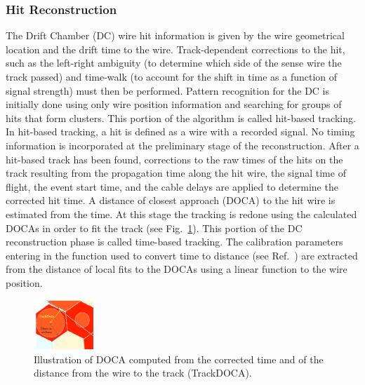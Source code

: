 \subsubsection{Hit Reconstruction}
\label{sec:hitrecon}

The Drift Chamber (DC) wire hit information is given by the wire geometrical location and the drift time to the
wire. Track-dependent corrections to the hit, such as the left-right ambiguity (to determine which side of the
sense wire the track passed) and time-walk (to account for the shift in time as a function of signal strength)
must then be performed. Pattern recognition for the DC is initially done using only wire position information and
searching for groups of hits that form clusters. This portion of the algorithm is called hit-based tracking.  In
hit-based tracking, a hit is defined as a wire with a recorded signal. No timing information is incorporated at the
preliminary stage of the reconstruction. After a hit-based track has been found, corrections to the raw times of
the hits on the track resulting from the propagation time along the hit wire, the signal time of flight, the event start
time, and the cable delays are applied to determine the corrected hit time. A distance of closest approach (DOCA)
to the hit wire is estimated from the time. At this stage the tracking is redone using the calculated DOCAs in order
to fit the track (see Fig.~\ref{fig:docas}). This portion of the DC reconstruction phase is called time-based tracking.
The calibration parameters entering in the function used to convert time to distance (see Ref.~\cite{dc-nim}) are
extracted from the distance of local fits to the DOCAs using a linear function to the wire position. 

\begin{figure}
\centering
\includegraphics[width=0.2\textwidth]{pics/dcPattern10.png}
\caption{Illustration of DOCA computed from the corrected time and of the distance from the wire to the track
  (TrackDOCA).}
\label{fig:docas}
\end{figure}

